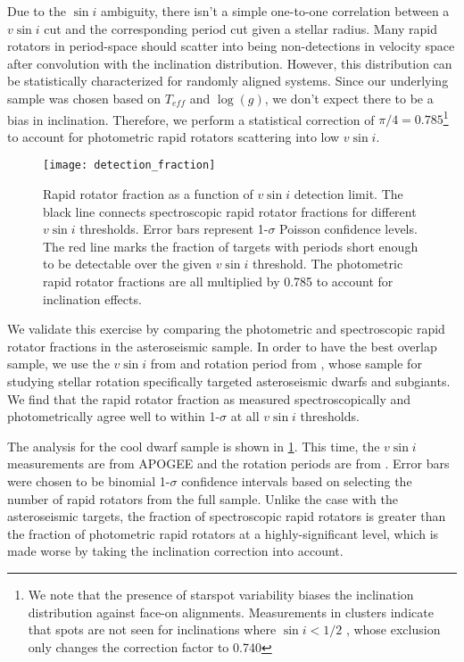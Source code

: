 \documentclass[manuscript]{aastex6}
\newcommand{\vsini}{\ensuremath{v \sin i}}
\newcommand{\Teff}{\ensuremath{T_{eff}}}
\newcommand{\logg}{\ensuremath{\log(g)}}
\begin{document}
Due to the \(\sin i\) ambiguity, there isn't a simple one-to-one correlation
between a \vsini{} cut and the corresponding period cut given a stellar radius.
Many rapid rotators in period-space should scatter into being non-detections in
velocity space after convolution with the inclination distribution. However,
this distribution can be statistically characterized for randomly
aligned systems. Since our underlying sample was chosen based on
\Teff{} and \logg{}, we don't expect there to be a bias in inclination.
Therefore, we perform a statistical correction of \(\pi/4=0.785\)\footnote{We 
  note that the presence of starspot variability biases the
    inclination distribution against face-on alignments. Measurements
    in clusters indicate that spots are not seen for inclinations where 
    \(\sin i < 1/2\) \citep{Jackson10}, whose exclusion only changes the 
correction factor to 0.740} 
to account for photometric rapid rotators scattering into low
\vsini{}. 

\begin{figure}[htb]
    \centering
    \texttt{[image: detection\_fraction]}
    \caption{Rapid rotator fraction as a function of \vsini{} detection limit.
    The black line connects spectroscopic rapid rotator fractions for different
    \vsini{} thresholds. Error bars represent 1-\(\sigma\) Poisson confidence
    levels. The red line marks the fraction of targets with \citet{McQuillan14} 
periods short enough to be detectable over the given \vsini{} threshold. The
photometric rapid rotator fractions are all multiplied by 0.785 to account for
inclination effects.\label{fig:detection_fraction}}
\end{figure}

We validate this exercise by comparing the photometric and spectroscopic
rapid rotator fractions in the asteroseismic sample. In order to have the best
overlap sample, we use the \vsini{} from \citet{Bruntt12} and rotation period 
from \citet{Garcia14}, whose sample for studying stellar rotation specifically
targeted asteroseismic dwarfs and subgiants. We find that the rapid rotator
fraction as measured spectroscopically and photometrically agree well to within
1-\(\sigma\) at all \vsini{} thresholds. 

The analysis for the cool dwarf sample is shown in 
\cref{fig:detection_fraction}. This time, the \vsini{} measurements
are from APOGEE and the rotation periods are from \citet{McQuillan14}. Error
bars were chosen to be binomial 1-\(\sigma\) confidence intervals based on
selecting the number of rapid rotators from the full sample. Unlike  
the case with the asteroseismic targets, the fraction of spectroscopic rapid
rotators is greater than the fraction of photometric rapid
rotators at a highly-significant level, which is made worse by taking the
inclination correction into account.
\end{document}
